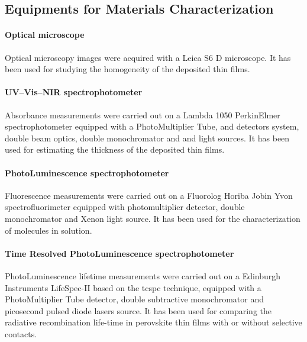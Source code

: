 	\subsection{Equipments for Materials Characterization}

	\paragraph{Optical microscope} Optical microscopy images were acquired with a Leica S6 D microscope.
	It has been used for studying the homogeneity of the deposited thin films.
	
	\paragraph{UV--Vis--NIR spectrophotometer} Absorbance measurements were carried out on a Lambda 1050 PerkinElmer spectrophotometer equipped with a PhotoMultiplier Tube,  and  detectors system, double beam optics, double monochromator and  and  light sources.
	It has been used for estimating the thickness of the deposited thin films.
	
	\paragraph{PhotoLuminescence spectrophotometer} Fluorescence measurements were carried out on a Fluorolog Horiba Jobin Yvon spectrofluorimeter equipped with photomultiplier detector, double monochromator and Xenon light source.
	It has been used for the characterization of molecules in solution.

	\paragraph{Time Resolved PhotoLuminescence spectrophotometer} PhotoLuminescence lifetime measurements were carried out on a Edinburgh Instruments LifeSpec-II based on the \gls{tcspc} technique, equipped with a PhotoMultiplier Tube detector, double subtractive monochromator and picosecond pulsed diode lasers source.
	It has been used for comparing the radiative recombination life-time in perovskite thin films with or without selective contacts.
	

